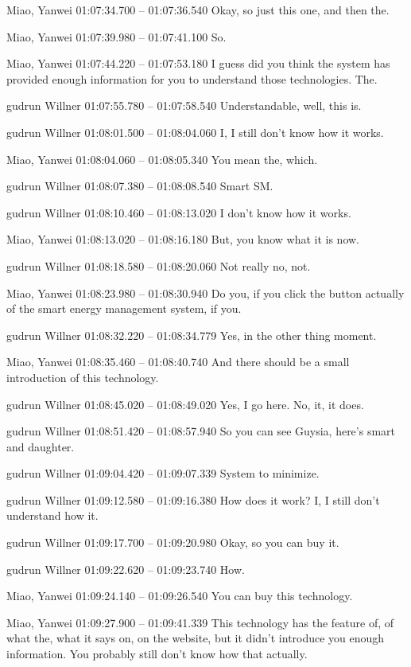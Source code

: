 {Miao, Yanwei 01:07:34.700 -- 01:07:36.540
Okay, so just this one, and then the.

Miao, Yanwei 01:07:39.980 -- 01:07:41.100
So.

Miao, Yanwei 01:07:44.220 -- 01:07:53.180
I guess did you think the system has provided enough information for you to understand those technologies. The.

gudrun Willner 01:07:55.780 -- 01:07:58.540
Understandable, well, this is.

gudrun Willner 01:08:01.500 -- 01:08:04.060
I, I still don't know how it works.

Miao, Yanwei 01:08:04.060 -- 01:08:05.340
You mean the, which.

gudrun Willner 01:08:07.380 -- 01:08:08.540
Smart SM.

gudrun Willner 01:08:10.460 -- 01:08:13.020
I don't know how it works.

Miao, Yanwei 01:08:13.020 -- 01:08:16.180
But, you know what it is now.

gudrun Willner 01:08:18.580 -- 01:08:20.060
Not really no, not.

Miao, Yanwei 01:08:23.980 -- 01:08:30.940
Do you, if you click the button actually of the smart energy management system, if you.

gudrun Willner 01:08:32.220 -- 01:08:34.779
Yes, in the other thing moment.

Miao, Yanwei 01:08:35.460 -- 01:08:40.740
And there should be a small introduction of this technology.

gudrun Willner 01:08:45.020 -- 01:08:49.020
Yes, I go here. No, it, it does.

gudrun Willner 01:08:51.420 -- 01:08:57.940
So you can see Guysia, here's smart and daughter.

gudrun Willner 01:09:04.420 -- 01:09:07.339
System to minimize.

gudrun Willner 01:09:12.580 -- 01:09:16.380
How does it work? I, I still don't understand how it.

gudrun Willner 01:09:17.700 -- 01:09:20.980
Okay, so you can buy it.

gudrun Willner 01:09:22.620 -- 01:09:23.740
How.

Miao, Yanwei 01:09:24.140 -- 01:09:26.540
You can buy this technology.

Miao, Yanwei 01:09:27.900 -- 01:09:41.339
This technology has the feature of, of what the, what it says on, on the website, but it didn't introduce you enough information. You probably still don't know how that actually.

}
